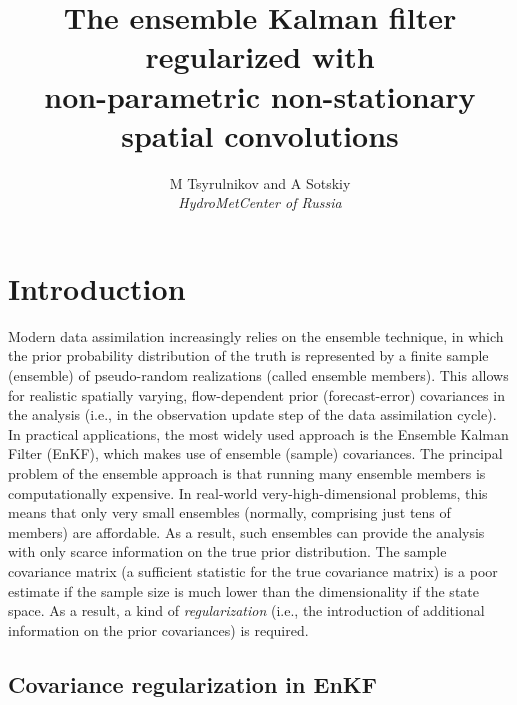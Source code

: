 \documentclass[12pt]{article}
\title{The ensemble Kalman filter regularized with \\non-parametric
   non-stationary spatial convolutions\\
    \bigskip
}
\author{M Tsyrulnikov and A Sotskiy\\
   \smallskip
   {\em HydroMetCenter of Russia}\\
   }
\newcommand{\ie}{i.e., }
\begin{document}
\maketitle




\section {Introduction}




Modern  data assimilation increasingly relies on the ensemble technique,
in which the prior probability distribution of the truth is represented by
a finite sample (ensemble) of pseudo-random realizations (called ensemble members).
This allows for realistic spatially varying, flow-dependent prior (forecast-error) covariances in the analysis
(\ie in the observation update step of the data assimilation cycle).
In practical applications, the  most widely used approach is the Ensemble Kalman Filter (EnKF),
which makes use of ensemble (sample) covariances.
The principal problem of the ensemble approach is  that running many ensemble members is
computationally expensive. In real-world very-high-dimensional problems,
this means that only very small ensembles (normally, comprising just tens of members) are affordable.
As a result, such ensembles can  provide the analysis  with
only scarce information on the true prior distribution. The sample covariance matrix 
(a sufficient statistic for the true covariance matrix) is a poor estimate if the sample size
is much lower than the dimensionality if the state space.
As a result, a kind of {\em regularization} (\ie the introduction of
additional information on the prior covariances) is required.






\subsection {Covariance regularization in EnKF}
\label{sec_covregu}
\end{document}
